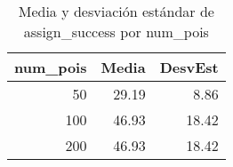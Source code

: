 \begin{table}
\caption{Media y desviación estándar de assign\_success por num_pois}
\label{tab:num_pois-stats}
\begin{tabular}{rrr}
\toprule
num_pois & Media & DesvEst \\
\midrule
50 & 29.19 & 8.86 \\
100 & 46.93 & 18.42 \\
200 & 46.93 & 18.42 \\
\bottomrule
\end{tabular}
\end{table}
